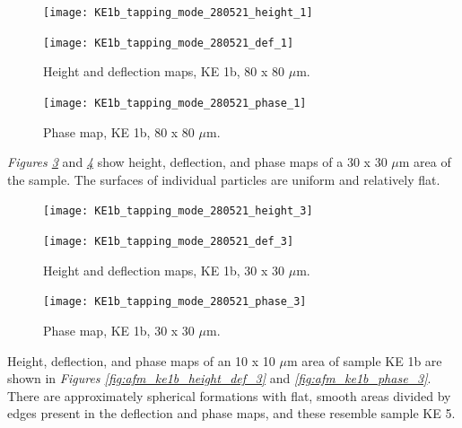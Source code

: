 \begin{figure}[H]
\centering
\begin{minipage}{.45\textwidth}
  \centering
  \texttt{[image: KE1b\_tapping\_mode\_280521\_height\_1]}
\end{minipage}
\begin{minipage}{.45\textwidth}
  \centering
  \texttt{[image: KE1b\_tapping\_mode\_280521\_def\_1]}
\end{minipage}
\caption[Height and deflection maps, KE 1b]{Height and deflection maps, KE 1b, 80 x 80 $\mu$m.}
\label{fig:afm_ke1b_height_def_1}
\end{figure}

\begin{figure}[H]
\centering
  \texttt{[image: KE1b\_tapping\_mode\_280521\_phase\_1]}
\caption[Phase map, KE 1b]{Phase map, KE 1b, 80 x 80 $\mu$m.}
\label{fig:afm_ke1b_phase_1}
\end{figure}

\textit{Figures \ref{fig:afm_ke1b_height_def_2}} and \textit{\ref{fig:afm_ke1b_phase_2}} show height, deflection, and phase maps of a 30 x 30 $\mu$m area of the sample. The surfaces of individual particles are uniform and relatively flat.

\begin{figure}[H]
\centering
\begin{minipage}{.45\textwidth}
  \centering
  \texttt{[image: KE1b\_tapping\_mode\_280521\_height\_3]}
\end{minipage}
\begin{minipage}{.45\textwidth}
  \centering
  \texttt{[image: KE1b\_tapping\_mode\_280521\_def\_3]}
\end{minipage}
\caption[Height and deflection maps, KE 1b]{Height and deflection maps, KE 1b, 30 x 30 $\mu$m.}
\label{fig:afm_ke1b_height_def_2}
\end{figure}

\begin{figure}[H]
\centering
  \texttt{[image: KE1b\_tapping\_mode\_280521\_phase\_3]}
\caption[Phase map, KE 1b]{Phase map, KE 1b, 30 x 30 $\mu$m.}
\label{fig:afm_ke1b_phase_2}
\end{figure}

Height, deflection, and phase maps of an 10 x 10 $\mu$m area of sample KE 1b are shown in \textit{Figures \ref{fig:afm_ke1b_height_def_3}} and \textit{\ref{fig:afm_ke1b_phase_3}}. There are approximately spherical formations with flat, smooth areas divided by edges present in the deflection and phase maps, and these resemble sample KE 5.

